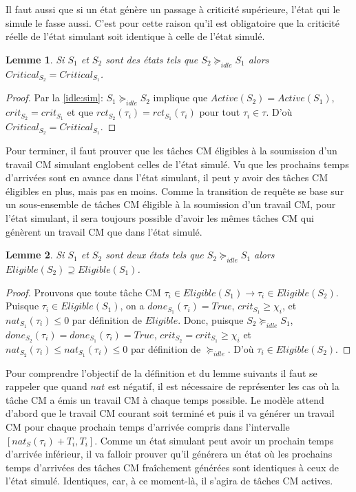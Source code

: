\documentclass[12pt,a4paper,oneside]{book}
\theoremstyle{break}
\theoremstyle{breakplain}
\newtheorem{lem}{Lemme}[chapter]
\begin{document}
Il faut aussi que si un état génère un passage à criticité supérieure, l'état qui le simule le fasse aussi. C'est pour cette raison qu'il est obligatoire que la criticité réelle de l'état simulant soit identique à celle de l'état simulé.\\

\begin{lem}
\label{idle:criteq}
Si $S_1$ et $S_2$ sont des états tels que $S_2 \succeq_{idle} S_1$ alors $Critical_{S_2} = Critical_{S_1}$.
\end{lem}

\begin{proof} Par la \autoref{idle:sim}: $S_1 \succeq_{idle} S_2$ implique que $Active(S_2) = Active(S_1)$, $crit_{S_2} = crit_{S_1}$ et que $rct_{S_2}(\tau_i) = rct_{S_1}(\tau_i)$ pour tout $\tau_i \in \tau$. D'où $Critical_{S_2} = Critical_{S_1}$.
\end{proof}

Pour terminer, il faut prouver que les tâches CM éligibles à la soumission d'un travail CM simulant englobent celles de l'état simulé. Vu que les prochains temps d'arrivées sont en avance dans l'état simulant, il peut y avoir des tâches CM éligibles en plus, mais pas en moins. Comme la transition de requête se base sur un sous-ensemble de tâches CM éligible à la soumission d'un travail CM, pour l'état simulant, il sera toujours possible d'avoir les mêmes tâches CM qui génèrent un travail CM que dans l'état simulé.\\

\begin{lem}
\label{idle:elisuper}
Si $S_1$ et $S_2$ sont deux états tels que $S_2 \succeq_{idle}S_1$ alors $Eligible(S_2) \supseteq Eligible(S_1)$.
\end{lem}
\begin{proof} Prouvons que toute tâche CM $\tau_i \in Eligible(S_1) \rightarrow \tau_i \in Eligible(S_2)$. Puisque $\tau_i \in Eligible(S_1)$, on a $done_{S_1}(\tau_i) = True$,  $crit_{S_1} \geq \chi_i$, et $nat_{S_1}(\tau_i) \leq 0$ par définition de $Eligible$. Donc, puisque $S_2 \succeq_{idle}S_1$, $done_{S_2}(\tau_i) = done_{S_1}(\tau_i) = True$,  $crit_{S_2} = crit_{S_1} \geq \chi_i$ et $nat_{S_2}(\tau_i) \leq nat_{S_1}(\tau_i) \leq 0$ par définition de $\succeq_{idle}$. D'où $\tau_i \in Eligible(S_2)$.
\end{proof}

Pour comprendre l'objectif de la définition et du lemme suivants il faut se rappeler que quand $nat$ est négatif, il est nécessaire de représenter les cas où la tâche CM a émis un travail CM à chaque temps possible. Le modèle attend d'abord que le travail CM courant soit terminé et puis il va générer un travail CM pour chaque prochain temps d'arrivée compris dans l'intervalle $[nat_S(\tau_i)+T_i, T_i]$. Comme un état  simulant peut avoir un prochain temps d'arrivée inférieur, il va falloir prouver qu'il générera un état où les prochains temps d'arrivées des tâches CM fraîchement générées sont identiques à ceux de l'état simulé. Identiques, car, à ce moment-là, il s'agira de tâches CM actives.
\end{document}
